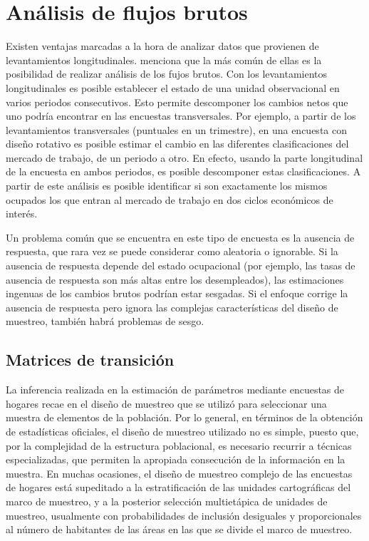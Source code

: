 \documentclass[
  12pt,
  spanish,
]{book}
\begin{document}
\hypertarget{anuxe1lisis-de-flujos-brutos}{%
\chapter{Análisis de flujos brutos}\label{anuxe1lisis-de-flujos-brutos}}

Existen ventajas marcadas a la hora de analizar datos que provienen de levantamientos longitudinales. \citet{Lynn_2009} menciona que la más común de ellas es la posibilidad de realizar análisis de los fujos brutos. Con los levantamientos longitudinales es posible establecer el estado de una unidad observacional en varios periodos consecutivos. Esto permite descomponer los cambios netos que uno podría encontrar en las encuestas transversales. Por ejemplo, a partir de los levantamientos transversales (puntuales en un trimestre), en una encuesta con diseño rotativo es posible estimar el cambio en las diferentes clasificaciones del mercado de trabajo, de un periodo a otro. En efecto, usando la parte longitudinal de la encuesta en ambos periodos, es posible descomponer estas clasificaciones. A partir de este análisis es posible identificar si son exactamente los mismos ocupados los que entran al mercado de trabajo en dos ciclos económicos de interés.

Un problema común que se encuentra en este tipo de encuesta es la ausencia de respuesta, que rara vez se puede considerar como aleatoria o ignorable. Si la ausencia de respuesta depende del estado ocupacional (por ejemplo, las tasas de ausencia de respuesta son más altas entre los desempleados), las estimaciones ingenuas de los cambios brutos podrían estar sesgadas. Si el enfoque corrige la ausencia de respuesta pero ignora las complejas características del diseño de muestreo, también habrá problemas de sesgo.

\hypertarget{matrices-de-transiciuxf3n}{%
\section{Matrices de transición}\label{matrices-de-transiciuxf3n}}

La inferencia realizada en la estimación de parámetros mediante encuestas de hogares recae en el diseño de muestreo que se utilizó para seleccionar una muestra de elementos de la población. Por lo general, en términos de la obtención de estadísticas oficiales, el diseño de muestreo utilizado no es simple, puesto que, por la complejidad de la estructura poblacional, es necesario recurrir a técnicas especializadas, que permiten la apropiada consecución de la información en la muestra. En muchas ocasiones, el diseño de muestreo complejo de las encuestas de hogares está supeditado a la estratificación de las unidades cartográficas del marco de muestreo, y a la posterior selección multietápica de unidades de muestreo, usualmente con probabilidades de inclusión desiguales y proporcionales al número de habitantes de las áreas en las que se divide el marco de muestreo.
\end{document}
